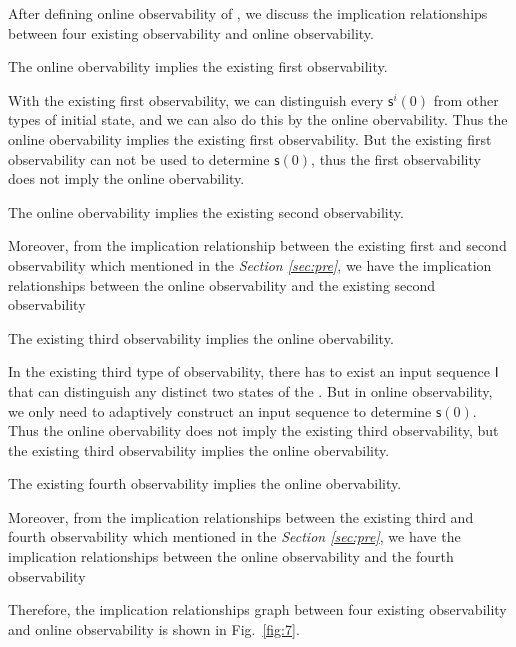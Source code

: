 After defining online observability of \BCNs, we discuss the implication relationships between four existing observability and online observability.
\begin{lemma}
The online obervability implies the existing first observability.
\label{lemm:3}
\end{lemma}

With the existing first observability, we can distinguish every $\mathsf{s}^{i}(0)$ from other types of initial state,  and we can also do this by the online obervability. Thus the online obervability implies the existing first observability. But the existing first observability can not be used to determine $\mathsf{s}(0)$, thus the first observability does not imply the online obervability.

\begin{lemma}
The online obervability implies the existing second observability.

\end{lemma}

 Moreover, from the implication relationship between the existing first and second observability which mentioned in the {\em Section \ref{sec:pre}}, we have the implication relationships between the online observability and the existing second observability
\begin{lemma}
The existing third observability implies the online obervability.
\label{lemm:4}
\end{lemma}

In the existing third type of observability, there has to exist an input sequence $\mathsf{I}$ that can distinguish any distinct two states of the \BCN. But in online observability, we only need to adaptively construct an input sequence to determine $\mathsf{s}(0)$. Thus the online obervability does not imply the existing third observability, but the existing third observability implies the online obervability. 

\begin{lemma}
The existing fourth observability implies the online obervability.
\label{lemma:5}
\end{lemma}

Moreover, from the implication relationships between the existing third and fourth observability which mentioned in the {\em Section \ref{sec:pre}}, we have the implication relationships between the online observability and the fourth observability

Therefore, the implication relationships graph between four existing observability and online observability is shown in Fig.~\ref{fig:7}.

